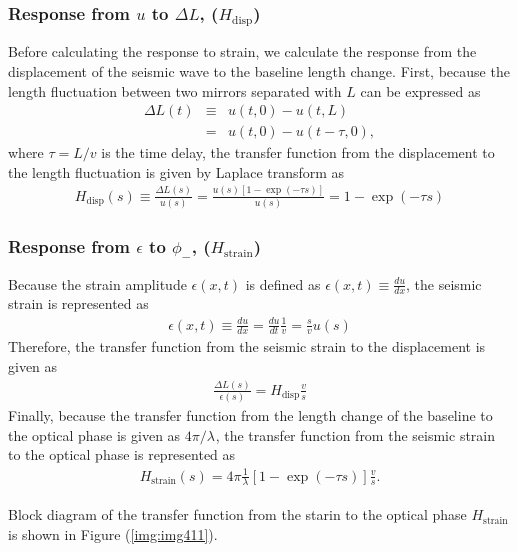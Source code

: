 \subsubsection{Response from $u$ to $\Delta{L}$, ($H_{\mathrm{disp}}$)}
Before calculating the response to strain, we calculate the response from the displacement of the seismic wave to the baseline length change. First, because the length fluctuation between two mirrors separated with $L$ can be expressed as 
\begin{eqnarray} 
  \Delta{L(t)} &\equiv& u(t,0) - u(t,L) \\
  &=& u(t,0) - u(t-\tau,0), \label{eq:eq403}
\end{eqnarray}
where $\tau=L/v$ is the time delay, the transfer function from the displacement to the length fluctuation is given by Laplace transform as
\begin{eqnarray} \label{eq:eq404}
  H_{\mathrm{disp}}(s) \equiv \frac{\Delta{L(s)}}{u(s)} = \frac{u(s)\left[ 1-\exp(-\tau{s}) \right]}{u(s)} = 1 - \exp(-\tau{s})
\end{eqnarray}

\subsubsection{Response from $\epsilon$ to $\phi_{-}$, ($H_{\mathrm{strain}}$)}
Because the strain amplitude $\epsilon{(x,t)}$ is defined as $\epsilon{(x,t)}\equiv\frac{du}{dx}$, the seismic strain is represented as 
\begin{eqnarray} 
  \epsilon{(x,t)} \equiv \frac{du}{dx} = \frac{du}{dt} \frac{1}{v} = \frac{s}{v}u(s) \label{eq:eq406}
\end{eqnarray}
Therefore, the transfer function from the seismic strain to the displacement is given  as
\begin{eqnarray} \label{eq:eq407b}
  \frac{\Delta{L(s)}}{\epsilon(s)} = H_{\mathrm{disp}} \frac{v}{s}
\end{eqnarray}
Finally, because the transfer function from the length change of the baseline to the optical phase is given as $4\pi/{\lambda_{{}}}$, the transfer function from the seismic strain to the optical phase is represented as 
\begin{eqnarray} \label{eq:eq407}
  H_{\mathrm{strain}}(s) = 4\pi\frac{1}{\lambda_{{}}} \left[1 - \exp(-\tau{s}) \right]\frac{v}{s}.
\end{eqnarray}

Block diagram of the transfer function from the starin to the optical phase $H_{\mathrm{strain}}$ is shown in Figure (\ref{img:img411}). 

